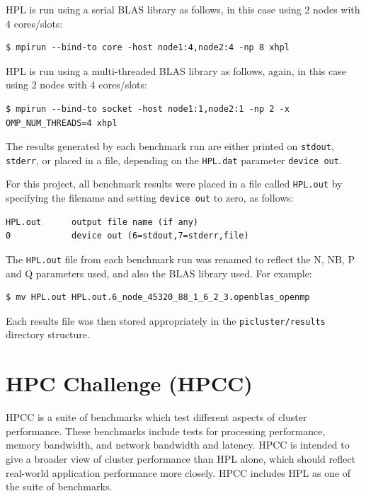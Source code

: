 \documentclass{report}
\begin{document}
HPL is run using a serial BLAS library as follows, in this case using 2 nodes with 4 cores/slots:

\lstset{style=type}
\begin{lstlisting}
$ mpirun --bind-to core -host node1:4,node2:4 -np 8 xhpl
\end{lstlisting}

HPL is run using a multi-threaded BLAS library as follows, again, in this case using 2 nodes with 4 cores/slots:

\lstset{style=type}
\begin{lstlisting}
$ mpirun --bind-to socket -host node1:1,node2:1 -np 2 -x OMP_NUM_THREADS=4 xhpl
\end{lstlisting}

The results generated by each benchmark run are either printed on \verb|stdout|, \verb|stderr|, or placed in a file, depending on the \verb|HPL.dat| parameter \verb|device out|.

For this project, all benchmark results were placed in a file called \verb|HPL.out| by specifying the filename and setting \verb|device out| to zero, as follows:

\lstset{style=listing}
\begin{lstlisting}[numbers=none, caption=HPL.dat]
HPL.out      output file name (if any)
0            device out (6=stdout,7=stderr,file)
\end{lstlisting}


The \verb|HPL.out| file from each benchmark run was renamed to reflect the N, NB, P and Q parameters used, and also the BLAS library used. For example:

\lstset{style=type}
\begin{lstlisting}
$ mv HPL.out HPL.out.6_node_45320_88_1_6_2_3.openblas_openmp
\end{lstlisting}

Each results file was then stored appropriately in the \verb|picluster/results| directory structure. 


%
%
\section{HPC Challenge (HPCC)}

HPCC is a suite of benchmarks which test different aspects of cluster performance. These benchmarks include tests for processing performance, memory bandwidth, and network bandwidth and latency. HPCC is intended to give a broader view of cluster performance than HPL alone, which should reflect real-world application performance more closely. HPCC includes HPL as one of the suite of benchmarks.
\end{document}
